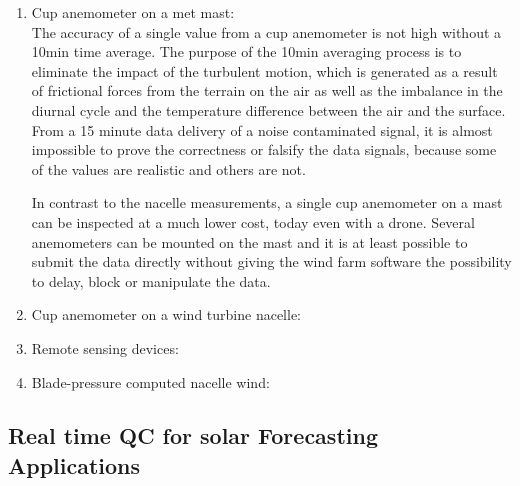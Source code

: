 \begin{enumerate}
    \item Cup anemometer on a met mast:\\

The accuracy of a single value from a cup anemometer is not high without a 10min time average. The purpose of the 10min averaging process is to eliminate the impact of the turbulent motion, which is generated as a result of frictional forces from the terrain on the air as well as the imbalance in the diurnal cycle and the temperature difference between the air and the surface.
From a 15 minute data delivery of a noise contaminated signal, it is almost impossible to prove the correctness or falsify the data  signals, because some of the values are realistic and others are not.

In contrast to the nacelle measurements, a single cup anemometer on a mast can be inspected at a much lower cost, today even with a drone. Several anemometers can be mounted on the mast and it is at least possible to submit the data directly without giving the wind farm software the possibility to delay, block or manipulate the data.

    \item Cup anemometer on a wind turbine nacelle:\\
      {\color{blue}{Author: COM -- needs more authors/discussion}}
    \item Remote sensing devices:\\
{\color{blue}{Author: COM -- needs more authors/discussion}}




    \item Blade-pressure computed nacelle wind:\\
{\color{blue}{Author: COM -- needs more authors/discussion -- there are areas, where this is used to a great extend and the results are astonishing good as a fit for the produced power. These methods are mainly used for wind farm control; nevertheless they have some important and interesting aspect also for real-time forecasting....}}


\end{enumerate}



\subsection{Real time  QC for solar Forecasting Applications}

